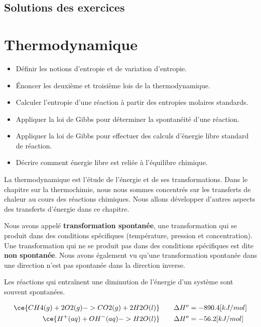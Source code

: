 \documentclass[
  11pt,
  a4paper,
  openany]{book}
\providecommand{\tightlist}{%
  \setlength{\itemsep}{0pt}\setlength{\parskip}{0pt}}
\begin{document}
\clearpage

\section{Solutions des exercices} \shipoutAnswer

\chapter{Thermodynamique}\label{thermodynamique}

\begin{objectives}

\begin{itemize}
\tightlist
\item
  Définir les notions d'entropie et de variation d'entropie.
\item
  Énoncer les deuxième et troisième lois de la thermodynamique.
\item
  Calculer l'entropie d'une réaction à partir des entropies molaires standards.
\item
  Appliquer la loi de Gibbs pour déterminer la spontanéité d'une réaction.
\item
  Appliquer la loi de Gibbs pour effectuer des calculs d'énergie libre standard de réaction.
\item
  Décrire comment énergie libre est reliée à l'équilibre chimique.
\end{itemize}

\end{objectives}

La thermodynamique est l'étude de l'énergie et de ses transformations. Dans le chapitre sur la thermochimie, nous nous sommes concentrés sur les transferts de chaleur au cours des réactions chimiques. Nous allons développer d'autres aspects des transferts d'énergie dans ce chapitre.

Nous avons appelé \textbf{transformation spontanée}, une transformation qui se produit dans des conditions spécifiques (température, pression et concentration). Une transformation qui ne se produit pas dans des conditions spécifiques est dite \textbf{non spontanée}. Nous avons également vu qu'une transformation spontanée dans une direction n'est pas spontanée dans la direction inverse.

Les réactions qui entraînent une diminution de l'énergie d'un système sont souvent spontanées.

\[
\begin{split}
    \ce{CH4(g) + 2O2(g) -> CO2(g) + 2H2O(l)} &\qquad \Delta H^{o} = -890.4 [kJ/mol] \\
    \ce{H^+(aq) + OH^-(aq) -> H2O(l)} &\qquad \Delta H^{o} = -56.2 [kJ/mol]
\end{split}
\]
\end{document}
